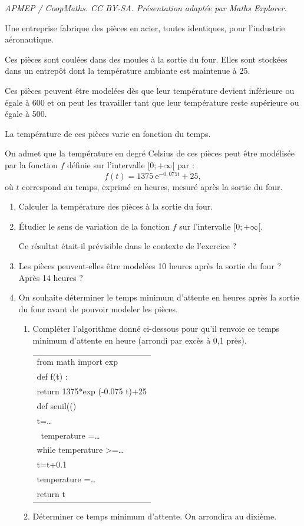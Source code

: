\documentclass[10pt]{article}
\providecommand{\e}{{\mathrm{e}}}
\providecommand{\np}[2][]{{#2~#1}}
\providecommand{\dotfill}{\ldots}
\begin{document}
\noindent\textit{APMEP / CoopMaths. CC BY-SA. Présentation adaptée par Maths Explorer.}\par\medskip
\medskip

Une entreprise fabrique des pièces en acier, toutes identiques, pour l’industrie
aéronautique.

Ces pièces sont coulées dans des moules à la sortie du four. Elles sont stockées dans un
entrepôt dont la température ambiante est maintenue à 25\textcelsius.

Ces pièces peuvent être modelées dès que leur température devient inférieure ou égale à
600\textcelsius{} et on peut les travailler tant que leur température reste supérieure ou égale à 500\textcelsius.

La température de ces pièces varie en fonction du temps.

On admet que la température en degré Celsius de ces pièces peut être modélisée par la
fonction $f$ définie sur l’intervalle $[0 ; +\infty[$ par :
\[f(t) = \np{1 375}\e^{-0,075t} + 25,\]
où $t$ correspond au temps, exprimé en heures, mesuré après la sortie du four.

\begin{enumerate}
\item  Calculer la température des pièces à la sortie du four.
\item Étudier le sens de variation de la fonction $f$ sur l’intervalle $[0 ; +\infty[$.

 Ce résultat était-il prévisible dans le contexte de l’exercice ?
\item Les pièces peuvent-elles être modelées 10 heures après la sortie du four ? Après 14 heures ?
\item On souhaite déterminer le temps minimum d’attente en heures après la sortie du four avant
de pouvoir modeler les pièces.

\begin{enumerate}
\item  Compléter l’algorithme donné ci-dessous pour qu’il renvoie ce temps minimum d’attente en heure (arrondi par excès à 0,1 près).

\begin{tabular}[]{l}
from math import exp\\
def f(t) :\\
\phantom{xxxx}return 1375*exp (-0.075 t)+25\\
def seuil(()\\
\phantom{xxxx}t=\dotfill\\\
\phantom{xxxx}temperature =\dotfill\\
\phantom{xxxx}while temperature >=\dotfill\\
\phantom{xxxxxx}t=t+0.1\\
\phantom{xxxxxx}temperature =\dotfill\\
\phantom{xxxx}return t\\
\end{tabular}

\item Déterminer ce temps minimum d’attente. On arrondira au dixième.
\end{enumerate}
\end{enumerate}

\vspace{0,5cm}
\end{document}
